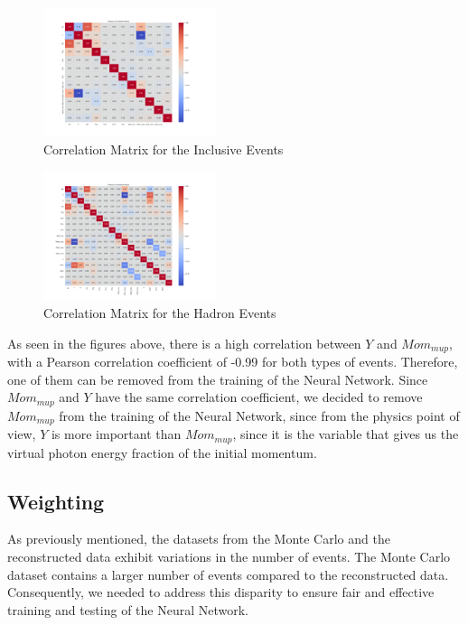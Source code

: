 \documentclass[EPJ,twocolumn]{webofc}
\begin{document}
\begin{figure}[H]
    \centering
    \includegraphics[width=0.45\textwidth]{graphs/inclusive_correlation_matrix.png}
    \caption{Correlation Matrix for the Inclusive Events}
    \label{fig:inclusive_correlation_matrix}
\end{figure}

\begin{figure}[H]
    \centering
    \includegraphics[width=0.45\textwidth]{graphs/hadron_correlation_matrix.png}
    \caption{Correlation Matrix for the Hadron Events}
    \label{fig:hadron_correlation_matrix}
\end{figure}


As seen in the figures above, there is a high correlation between $Y$ and $Mom_{mup}$, with
a Pearson correlation coefficient of -0.99 for both types of events. Therefore, one of them can be removed from the training
of the Neural Network. Since $Mom_{mup}$ and $Y$ have the same correlation coefficient, we decided to remove $Mom_{mup}$ from the training of the Neural Network,
since from the physics point of view, $Y$ is more important than $Mom_{mup}$, since it is the variable that gives us the virtual photon energy fraction of the initial momentum. 

\subsection{Weighting}
As previously mentioned, the datasets from the Monte Carlo and the reconstructed data exhibit variations in the number of events.
The Monte Carlo dataset contains a larger number of events compared to the reconstructed data. Consequently, we needed to address this disparity to ensure fair and effective training and testing of the Neural Network.
\end{document}
